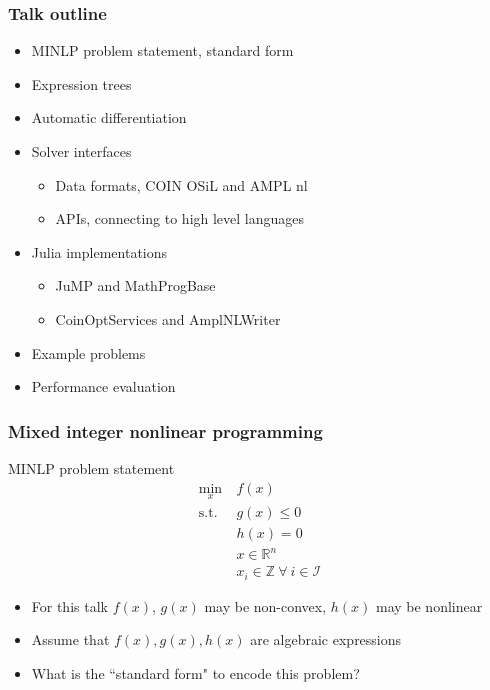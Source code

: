 \documentclass[compressed,dvips,letter]{beamer}
\begin{document}
\begin{frame}[fragile]\frametitle{Talk outline}
\begin{itemize}
  \item MINLP problem statement, standard form
  \item Expression trees
  \item Automatic differentiation
  \item Solver interfaces
  \begin{itemize}
    \item Data formats, COIN OSiL and AMPL nl
    \item APIs, connecting to high level languages
  \end{itemize}
  \item Julia implementations
  \begin{itemize}
    \item JuMP and MathProgBase
    \item CoinOptServices and AmplNLWriter
  \end{itemize}
  \item Example problems
  \item Performance evaluation
\end{itemize}

\end{frame}
%
%



\begin{frame}[fragile]\frametitle{Mixed integer nonlinear programming}

\begin{block}{\center MINLP problem statement}
\vspace{-15pt}
\begin{align*}
\min_x ~ & f(x) \\
\text{s.t.} ~ & g(x) \leq 0 \\
& h(x) = 0 \\
& x \in \mathbb{R}^n \\
& x_i \in \mathbb{Z} ~ \forall ~ i \in \mathcal{I}
\end{align*}
\end{block}

\begin{itemize}
  \item For this talk $f(x)$, $g(x)$ may be non-convex, $h(x)$ may be nonlinear
  \item Assume that $f(x), g(x), h(x)$ are algebraic expressions
  \item What is the ``standard form" to encode this problem?
\end{itemize}

\end{frame}
%
%
\end{document}
